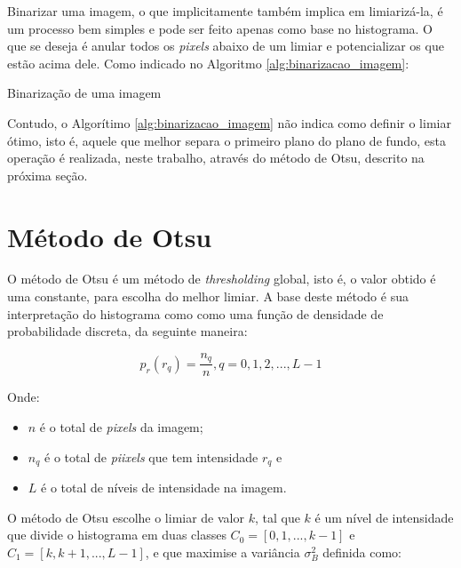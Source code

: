 Binarizar uma imagem, o que implicitamente também implica em limiarizá-la, é
um processo bem simples e pode ser feito apenas como base no histograma. O que
se deseja é anular todos os \textit{pixels} abaixo de um limiar e
potencializar os que estão acima dele. Como indicado no Algoritmo \ref{alg:binarizacao_imagem}:

\begin{algorithm}[H]
\caption{Binarização de uma imagem}\label{alg:binarizacao_imagem}
\end{algorithm}

Contudo, o Algorítimo \ref{alg:binarizacao_imagem} não indica como definir o limiar
ótimo, isto é, aquele que melhor separa o primeiro plano do plano de fundo, esta
operação é realizada, neste trabalho, através do método de Otsu, descrito na próxima seção.

\section{Método de Otsu}\label{sec:metodo_otsu}

O método de Otsu é um método de \textit{thresholding} global, isto é, o valor obtido é
uma constante, para escolha do melhor limiar. A base deste método é sua interpretação
do histograma como como uma função de densidade de probabilidade
discreta, da seguinte maneira:

\begin{equation}\label{eq:histograma_norm}
  p_r(r_q) = \frac{n_q}{n}, q = 0, 1, 2, ..., L-1
\end{equation}

Onde:

\begin{itemize}
  \item $ n $ é o total de \textit{pixels} da imagem;
  \item $ n_q $ é o total de \textit{piixels} que tem intensidade $ r_q $ e
  \item $ L $ é o total de níveis de intensidade na imagem.
\end{itemize}

O método de Otsu escolhe o limiar de valor $ k $, tal que $ k $ é um nível de
intensidade que divide o histograma em duas classes
$ C_0 = [0, 1, ..., k-1] $ e $ C_1 = [k, k+1, ..., L-1] $, e que maximise a
variância $ \sigma_{B}^2 $ definida como:

